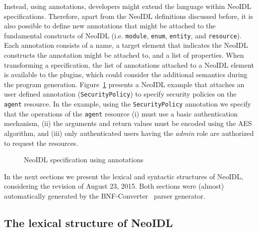 \documentclass{ws-ijseke}
\newcommand{\neoidl}{NeoIDL}
\begin{document}
Instead,
using annotations, developers might extend the language within \neoidl{}
specifications. Therefore, apart from the \neoidl{} definitions
discussed before, it is also possible to define new annotations that
might be attached to the fundamental constructs of \neoidl{} (i.e.
\texttt{module}, \texttt{enum}, \texttt{entity}, and
\texttt{resource}). Each annotation consists of a name, a target
element that indicates the \neoidl{} constructs the annotation 
might be attached to, and a list of properties. When transforming 
a specification, the list of annotations attached to a \neoidl{}
element is available to the plugins, which could consider the 
additional semantics during the program generation. Figure~\ref{lst:agent}
presents a \neoidl{} example that attaches an user defined
annotation (\texttt{SecurityPolicy}) to specify security policies 
on the \texttt{agent} resource. In the example, 
using the \texttt{SecurityPolicy} annotation we specify
that the operations of the \texttt{agent} resource
(i) must use a basic authentication mechanism, (ii)
the arguments and return values must be encoded using the
AES algorithm, and (iii) only authenticated users
having the \emph{admin} role are authorized to request the
resources. 

 
\begin{figure}
\begin{small}

\vspace{-.5cm}
\end{small}
\caption{\neoidl{} specification using annotations}
\label{lst:agent}
\end{figure}

In the next sections we present the lexical and 
syntactic structures of NeoIDL, considering 
the revision of August 23, 2015. Both sections 
were (almost) automatically generated by the BNF-Converter~\cite{forsberg-bnfc:2004} 
parser generator. 

\newcommand{\emptyP}{\mbox{$\epsilon$}}
\newcommand{\terminal}[1]{\mbox{{\texttt {#1}}}}
\newcommand{\nonterminal}[1]{\mbox{$\langle \mbox{{\sl #1 }} \! \rangle$}}
\newcommand{\arrow}{\mbox{::=}}
\newcommand{\delimit}{\mbox{$|$}}
\newcommand{\reserved}[1]{\mbox{{\texttt {#1}}}}
\newcommand{\literal}[1]{\mbox{{\texttt {#1}}}}
\newcommand{\symb}[1]{\mbox{{\texttt {#1}}}}

\subsection{The lexical structure of NeoIDL}\label{sub:lexical}
\end{document}
